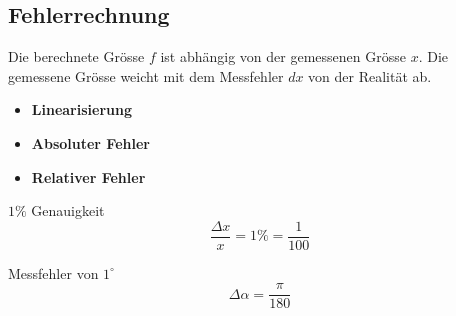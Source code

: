\subsection{Fehlerrechnung}
    Die berechnete Grösse $f$ ist abhängig von der gemessenen Grösse $x$.
    Die gemessene Grösse weicht mit dem Messfehler $dx$ von der Realität ab.
    \begin{itemize}
        \item \textbf{Linearisierung}
            \vspace*{-0.5em}
        \item \textbf{Absoluter Fehler}
            \vspace*{-0.5em}
        \item \textbf{Relativer Fehler}
            \vspace*{-0.5em}
    \end{itemize}
        \vspace{0.5em}
        \begin{minipage}{0.54\linewidth}
            \centering \vspace{4pt}
            $1\%$ Genauigkeit
            $$
                \frac{\Delta x}{x} = 1\% = \frac{1}{100}
            $$          
        \end{minipage}
        \begin{minipage}{0.45\linewidth}
            \centering
            Messfehler von $1^\circ$
            $$
                \Delta \alpha = \frac{\pi}{180}
            $$
        \end{minipage}